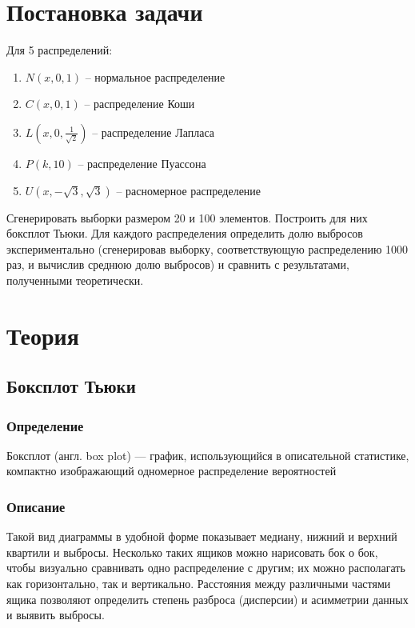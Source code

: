 \documentclass[a4paper]{article}
\begin{document}
    
    \tableofcontents
    \newpage
	\listoffigures
    \newpage
    \listoftables
    \newpage
\section {Постановка задачи}
\noindent Для 5 распределений:
\begin{enumerate}
	\item $N(x, 0, 1)$ -- нормальное распределение
	\item $C(x, 0, 1)$ -- распределение Коши
	\item $L(x, 0, \frac{1}{\sqrt{2}})$ -- распределение Лапласа
	\item $P(k, 10)$ -- распределение Пуассона
	\item $U(x, -\sqrt{3}, \sqrt{3})$ -- расномерное распределение
\end{enumerate}
Сгенерировать выборки размером 20 и 100 элементов.
Построить для них боксплот Тьюки.
Для каждого распределения определить долю выбросов экспериментально (сгенерировав выборку, соответствующую распределению 1000 раз, и вычислив среднюю долю выбросов) и сравнить с результатами, полученными теоретически.


\section {Теория}
\subsection{Боксплот Тьюки}
	\subsubsection{Определение}
	\noindent Боксплот (англ. box plot) — график, использующийся в описательной статистике, компактно изображающий одномерное распределение вероятностей

	\subsubsection{Описание}
	\noindent Такой вид диаграммы в удобной форме показывает медиану, нижний и верхний квартили и выбросы. Несколько таких ящиков можно нарисовать бок о бок, чтобы визуально сравнивать одно распределение с другим; их можно располагать как горизонтально, так и вертикально. Расстояния между различными частями ящика позволяют определить степень разброса (дисперсии) и асимметрии данных и выявить выбросы.
\end{document}
